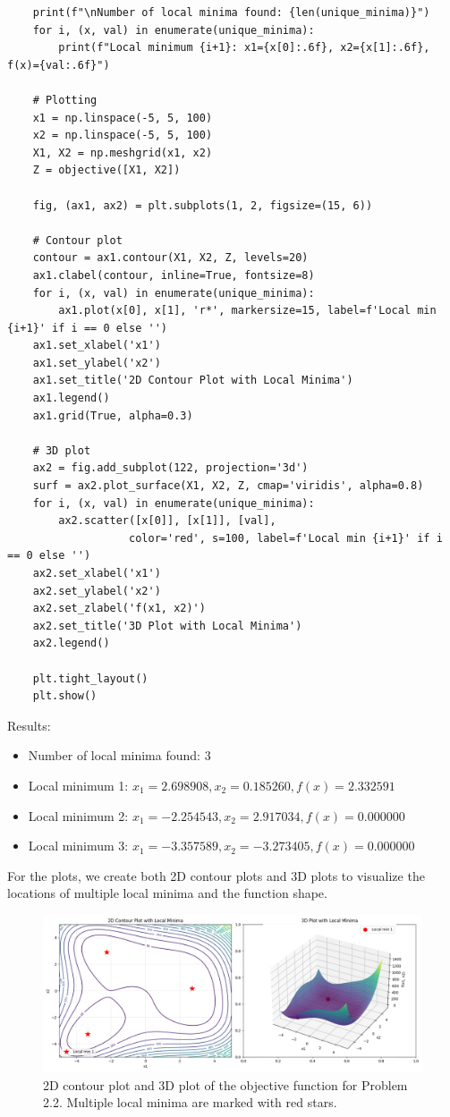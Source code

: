 \documentclass{article}
\begin{document}
\begin{enumerate}
\begin{verbatim}
    print(f"\nNumber of local minima found: {len(unique_minima)}")
    for i, (x, val) in enumerate(unique_minima):
        print(f"Local minimum {i+1}: x1={x[0]:.6f}, x2={x[1]:.6f}, f(x)={val:.6f}")
    
    # Plotting
    x1 = np.linspace(-5, 5, 100)
    x2 = np.linspace(-5, 5, 100)
    X1, X2 = np.meshgrid(x1, x2)
    Z = objective([X1, X2])
    
    fig, (ax1, ax2) = plt.subplots(1, 2, figsize=(15, 6))
    
    # Contour plot
    contour = ax1.contour(X1, X2, Z, levels=20)
    ax1.clabel(contour, inline=True, fontsize=8)
    for i, (x, val) in enumerate(unique_minima):
        ax1.plot(x[0], x[1], 'r*', markersize=15, label=f'Local min {i+1}' if i == 0 else '')
    ax1.set_xlabel('x1')
    ax1.set_ylabel('x2')
    ax1.set_title('2D Contour Plot with Local Minima')
    ax1.legend()
    ax1.grid(True, alpha=0.3)
    
    # 3D plot
    ax2 = fig.add_subplot(122, projection='3d')
    surf = ax2.plot_surface(X1, X2, Z, cmap='viridis', alpha=0.8)
    for i, (x, val) in enumerate(unique_minima):
        ax2.scatter([x[0]], [x[1]], [val], 
                   color='red', s=100, label=f'Local min {i+1}' if i == 0 else '')
    ax2.set_xlabel('x1')
    ax2.set_ylabel('x2')
    ax2.set_zlabel('f(x1, x2)')
    ax2.set_title('3D Plot with Local Minima')
    ax2.legend()
    
    plt.tight_layout()
    plt.show()
\end{verbatim}

Results:
\begin{itemize}
\item Number of local minima found: 3
\item Local minimum 1: $x_1 = 2.698908, x_2 = 0.185260, f(x) = 2.332591$
\item Local minimum 2: $x_1 = -2.254543, x_2 = 2.917034, f(x) = 0.000000$
\item Local minimum 3: $x_1 = -3.357589, x_2 = -3.273405, f(x) = 0.000000$
\end{itemize}

For the plots, we create both 2D contour plots and 3D plots to visualize the locations of multiple local minima and the function shape.

\begin{figure}[H]
    \centering
    \includegraphics[width=0.8\linewidth]{Figure_2_2.png}
    \caption{2D contour plot and 3D plot of the objective function for Problem 2.2. Multiple local minima are marked with red stars.}
    \label{fig:problem_2_2}
\end{figure}


\end{enumerate}
\end{document}
